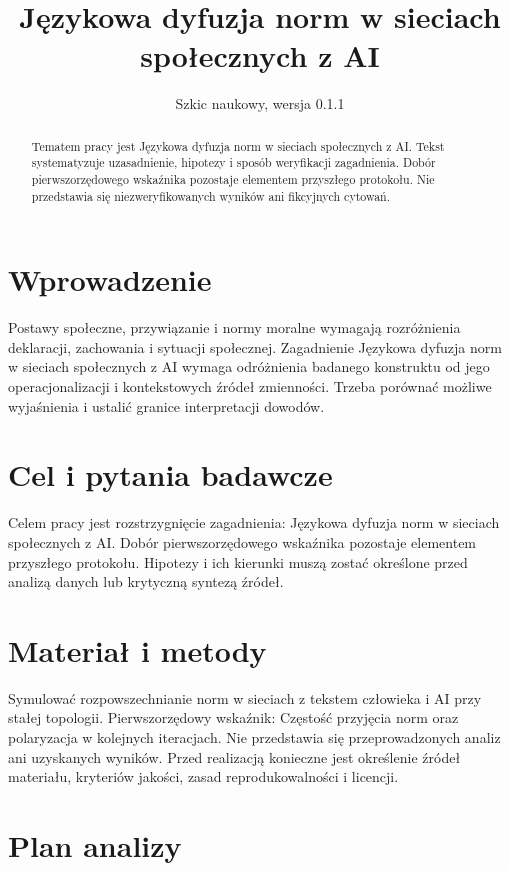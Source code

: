 \documentclass[11pt,a4paper]{article}
\title{Językowa dyfuzja norm w sieciach społecznych z AI}
\author{}
\date{Szkic naukowy, wersja 0.1.1}
\begin{document}
\maketitle

\begin{abstract}

Tematem pracy jest Językowa dyfuzja norm w sieciach społecznych z AI. Tekst systematyzuje uzasadnienie, hipotezy i sposób weryfikacji zagadnienia. Dobór pierwszorzędowego wskaźnika pozostaje elementem przyszłego protokołu. Nie przedstawia się niezweryfikowanych wyników ani fikcyjnych cytowań.

\end{abstract}

\section{Wprowadzenie}

Postawy społeczne, przywiązanie i normy moralne wymagają rozróżnienia deklaracji, zachowania i sytuacji społecznej. Zagadnienie Językowa dyfuzja norm w sieciach społecznych z AI wymaga odróżnienia badanego konstruktu od jego operacjonalizacji i kontekstowych źródeł zmienności. Trzeba porównać możliwe wyjaśnienia i ustalić granice interpretacji dowodów.

\section{Cel i pytania badawcze}

Celem pracy jest rozstrzygnięcie zagadnienia: Językowa dyfuzja norm w sieciach społecznych z AI. Dobór pierwszorzędowego wskaźnika pozostaje elementem przyszłego protokołu. Hipotezy i ich kierunki muszą zostać określone przed analizą danych lub krytyczną syntezą źródeł.

\section{Materiał i metody}

Symulować rozpowszechnianie norm w sieciach z tekstem człowieka i AI przy stałej topologii. Pierwszorzędowy wskaźnik: Częstość przyjęcia norm oraz polaryzacja w kolejnych iteracjach. Nie przedstawia się przeprowadzonych analiz ani uzyskanych wyników. Przed realizacją konieczne jest określenie źródeł materiału, kryteriów jakości, zasad reprodukowalności i licencji.

\section{Plan analizy}
\end{document}
